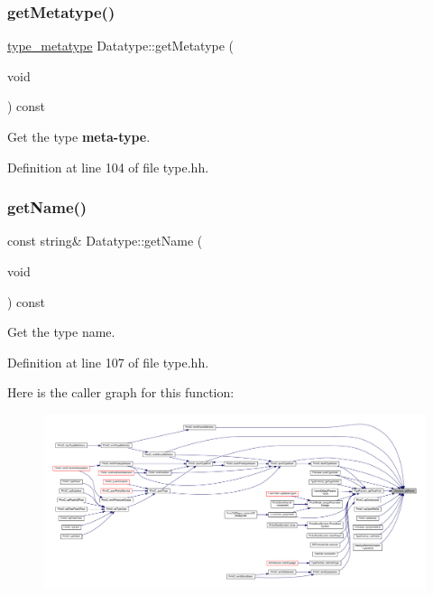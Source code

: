 \subsubsection{\texorpdfstring{getMetatype()}{getMetatype()}}
{\footnotesize\ttfamily \mbox{\hyperlink{type_8hh_aef6429f2523cdf4d415ba04a0209e61f}{type\+\_\+metatype}} Datatype\+::get\+Metatype (\begin{DoxyParamCaption}\item[{void}]{ }\end{DoxyParamCaption}) const\hspace{0.3cm}{\ttfamily [inline]}}



Get the type {\bfseries{meta-\/type}}. 



Definition at line 104 of file type.\+hh.

\mbox{\label{class_datatype_a8e0138dcd35a04ff0e55162459843d34}} 
\subsubsection{\texorpdfstring{getName()}{getName()}}
{\footnotesize\ttfamily const string\& Datatype\+::get\+Name (\begin{DoxyParamCaption}\item[{void}]{ }\end{DoxyParamCaption}) const\hspace{0.3cm}{\ttfamily [inline]}}



Get the type name. 



Definition at line 107 of file type.\+hh.

Here is the caller graph for this function\+:
\nopagebreak
\begin{figure}[H]
\begin{center}
\leavevmode
\includegraphics[width=350pt]{class_datatype_a8e0138dcd35a04ff0e55162459843d34_icgraph}
\end{center}
\end{figure}
\mbox{\label{class_datatype_aadd1006bf1bfff07a3230c2062e7fa52}} 
